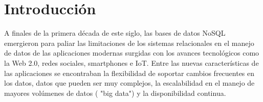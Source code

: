 \chapter{Introducción\label{01intro}}






A finales de la primera década de este siglo, las bases de datos NoSQL emergieron para paliar las limitaciones de los sistemas relacionales en el manejo de datos de las aplicaciones modernas surgidas con los avances tecnológicos como la Web 2.0, redes sociales, smartphones e IoT. Entre las nuevas características de las aplicaciones se encontraban la flexibilidad de soportar cambios frecuentes en los datos, datos que pueden ser muy complejos, la escalabilidad en el manejo de mayores volúmenes de datos ( "big data") y la disponibilidad continua.

